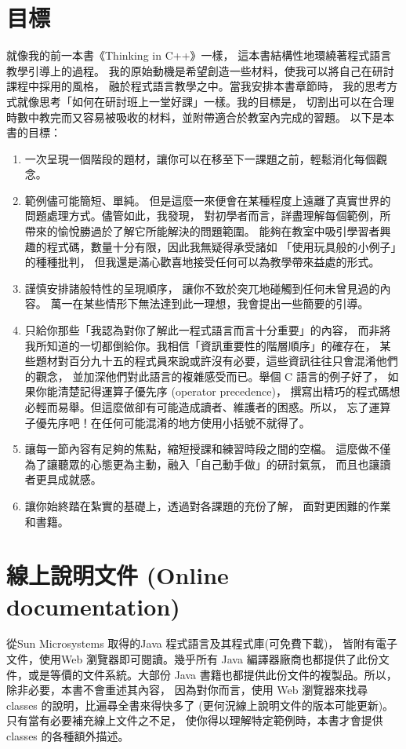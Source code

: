 \section{目標}
就像我的前一本書《Thinking in C++》一樣，
這本書結構性地環繞著程式語言教學引導上的過程。
我的原始動機是希望創造一些材料，使我可以將自己在研討課程中採用的風格，
融於程式語言教學之中。當我安排本書章節時，
我的思考方式就像思考「如何在研討班上一堂好課」一樣。我的目標是，
切割出可以在合理時數中教完而又容易被吸收的材料，並附帶適合於教室內完成的習題。
以下是本書的目標：
\begin{enumerate}
\item 一次呈現一個階段的題材，讓你可以在移至下一課題之前，輕鬆消化每個觀念。
\item 範例儘可能簡短、單純。
但是這麼一來便會在某種程度上遠離了真實世界的問題處理方式。儘管如此，我發現，
對初學者而言，詳盡理解每個範例，所帶來的愉悅勝過於了解它所能解決的問題範圍。
能夠在教室中吸引學習者興趣的程式碼，數量十分有限，因此我無疑得承受諸如
「使用玩具般的小例子」的種種批判，
但我還是滿心歡喜地接受任何可以為教學帶來益處的形式。
\item 謹慎安排諸般特性的呈現順序，
讓你不致於突兀地碰觸到任何未曾見過的內容。
萬一在某些情形下無法達到此一理想，我會提出一些簡要的引導。
\item 只給你那些「我認為對你了解此一程式語言而言十分重要」的內容，
而非將我所知道的一切都倒給你。我相信「資訊重要性的階層順序」的確存在，
某些題材對百分九十五的程式員來說或許沒有必要，這些資訊往往只會混淆他們的觀念，
並加深他們對此語言的複雜感受而已。舉個 C 語言的例子好了，
如果你能清楚記得運算子優先序 (operator precedence)，
撰寫出精巧的程式碼想必輕而易舉。但這麼做卻有可能造成讀者、維護者的困惑。所以，
忘了運算子優先序吧！在任何可能混淆的地方使用小括號不就得了。
\item 讓每一節內容有足夠的焦點，縮短授課和練習時段之間的空檔。
這麼做不僅為了讓聽眾的心態更為主動，融入「自己動手做」的研討氣氛，
而且也讓讀者更具成就感。
\item 讓你始終踏在紮實的基礎上，透過對各課題的充份了解，
面對更困難的作業和書籍。
\end{enumerate}

\section{線上說明文件 (Online documentation)}
從Sun Microsystems 取得的Java 程式語言及其程式庫(可免費下載)，
皆附有電子文件，使用Web 瀏覽器即可閱讀。幾乎所有
Java 編譯器廠商也都提供了此份文件，或是等價的文件系統。大部份
Java 書籍也都提供此份文件的複製品。所以，除非必要，本書不會重述其內容，
因為對你而言，使用 Web 瀏覽器來找尋 classes 的說明，比遍尋全書來得快多了
(更何況線上說明文件的版本可能更新)。只有當有必要補充線上文件之不足，
使你得以理解特定範例時，本書才會提供classes 的各種額外描述。 


